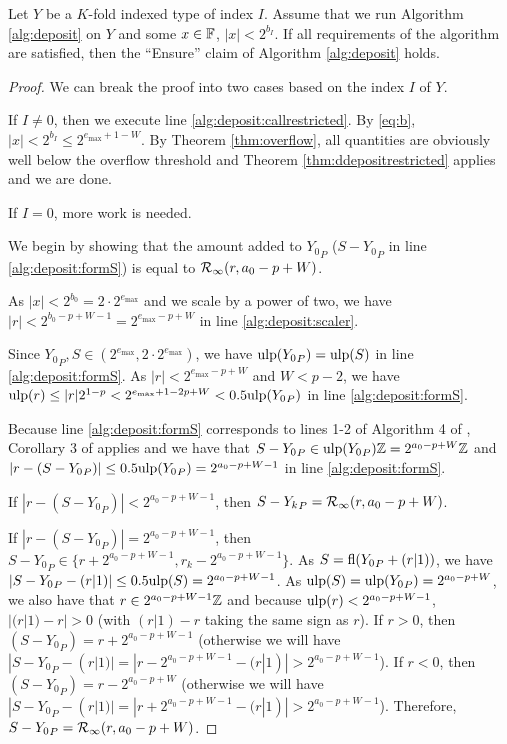       \begin{samepage}
      \begin{thm}
        Let $Y$ be a $K$-fold indexed type of index $I$. Assume that we run Algorithm \ref{alg:deposit} on $Y$ and some $x \in \mathbb{F}$, $|x| < 2^{b_I}$. If all requirements of the algorithm are satisfied, then the ``Ensure'' claim of Algorithm \ref{alg:deposit} holds.
        \label{thm:ddeposit}
      \end{thm}
    \end{samepage}

      \begin{proof}
        We can break the proof into two cases based on the index $I$ of $Y$.

        If $I \neq 0$, then we execute line \ref{alg:deposit:callrestricted}. By  \eqref{eq:b}, $|x| < 2^{b_I} \leq 2^{e_{\max} + 1 - W}$. By Theorem \ref{thm:overflow}, all quantities are obviously well below the overflow threshold and Theorem \ref{thm:ddepositrestricted} applies and we are done.

        If $I = 0$, more work is needed.

        We begin by showing that the amount added to ${Y_0}_P$ ($S - {Y_0}_P$ in line \ref{alg:deposit:formS}) is equal to $\mathcal{R}_\text{$\infty$}(r, a_0 - p + W)$.

        As $|x| < 2^{b_0} = 2 \cdot 2^{e_{\max}}$ and we scale by a power of two, we have $|r| < 2^{b_0 - p + W - 1} = 2^{e_{\max} - p + W}$ in line \ref{alg:deposit:scaler}.

        Since ${Y_0}_P, S \in (2^{e_{\max}}, 2 \cdot 2^{e_{\max}})$, we have $\text{ulp}({Y_0}_P) = \text{ulp}(S)$ in line \ref{alg:deposit:formS}. As $|r| < 2^{e_{\max} - p + W}$ and $W < p - 2$, we have $\text{ulp}(r) \leq |r| 2^{1 - p} < 2^{e_{\text{max}} + 1 - 2p + W} < 0.5\text{ulp}({Y_0}_P)$ in line \ref{alg:deposit:formS}.

        Because line \ref{alg:deposit:formS} corresponds to lines 1-2 of Algorithm 4 of \cite{repsum}, Corollary 3 of \cite{repsum} applies and we have that $S - {Y_0}_P \in \text{ulp}({Y_0}_P)\mathbb{Z} = 2^{a_0 - p + W}\mathbb{Z}$ and $|r - (S - {Y_0}_P)| \leq 0.5  \text{ulp}({Y_0}_P) = 2^{a_0 - p + W - 1}$ in line \ref{alg:deposit:formS}.

        If $|r - (S - {Y_0}_P)| < 2^{a_{0} - p + W - 1}$, then $S - {Y_k}_P = \mathcal{R}_\text{$\infty$}(r, a_{0} - p + W)$.

        If $|r - (S - {Y_0}_P)| = 2^{a_{0} - p + W - 1}$, then $S - {Y_0}_P \in \{r + 2^{a_0 - p + W - 1},  r_k - 2^{a_{0} - p + W - 1}\}$.
        As $S = \text{fl}({Y_0}_P + (r|1))$, we have $|S - {Y_0}_P - (r|1)| \leq 0.5\text{ulp}(S) = 2^{a_{0} - p + W - 1}$.  As $\text{ulp}(S) = \text{ulp}({Y_0}_P) = 2^{a_{0} - p + W}$, we also have that $r \in 2^{a_{0} - p + W - 1}\mathbb{Z}$  and because $\text{ulp}(r) < 2^{a_{0} - p + W - 1}$, $|(r|1) - r| > 0$ (with $(r|1) - r$ taking the same sign as $r$).
        If $r > 0$, then $(S - {Y_0}_P) = r + 2^{a_{0} - p + W - 1}$ (otherwise we will have $|S - {Y_0}_P - (r|1)| = |r - 2^{a_{0} - p + W - 1} - (r|1)| > 2^{a_{0} - p + W - 1}$).
        If $r < 0$, then $(S - {Y_0}_P) = r - 2^{a_{0} - p + W}$ (otherwise we will have $|S - {Y_0}_P - (r|1)| = |r + 2^{a_{0} - p + W - 1} - (r|1)| > 2^{a_{0} - p + W - 1}$). Therefore, $S - {Y_0}_P = \mathcal{R}_\text{$\infty$}(r, a_{0} - p + W)$.


\end{proof}
